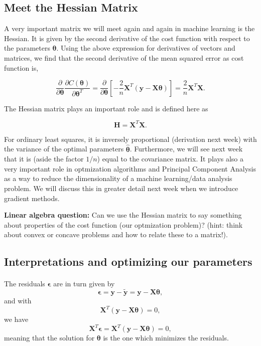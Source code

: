 \documentclass[%
oneside,                 %
final,                   %
10pt]{article}
\begin{document}
\subsection{Meet the Hessian Matrix}

A very important matrix we will meet again and again in machine
learning is the Hessian.  It is given by the second derivative of the
cost function with respect to the parameters $\bm{\theta}$. Using the above
expression for derivatives of vectors and matrices, we find that the
second derivative of the mean squared error as cost function is,

\[
\frac{\partial}{\partial \bm{\theta}}\frac{\partial C(\bm{\theta})}{\partial \bm{\theta}^T} =\frac{\partial}{\partial \bm{\theta}}\left[-\frac{2}{n}\bm{X}^T\left( \bm{y}-\bm{X}\bm{\theta}\right)\right]=\frac{2}{n}\bm{X}^T\bm{X}.  
\]

The Hessian matrix plays an important role and is defined here as

\[
\bm{H}=\bm{X}^T\bm{X}.
\]

For ordinary least squares, it is inversely proportional (derivation
next week) with the variance of the optimal parameters
$\hat{\bm{\theta}}$. Furthermore, we will see next week that it is
(aside the factor $1/n$) equal to the covariance matrix. It plays also a very
important role in optmization algorithms and Principal Component
Analysis as a way to reduce the dimensionality of a machine learning/data analysis
problem. We will discuss this in greater detail next week when we introduce gradient methods.

\textbf{Linear algebra question:}  Can we use the Hessian matrix to say something about properties of the cost function (our optmization  problem)? (hint: think about convex or concave problems and how to relate these to a matrix!). 

\subsection{Interpretations and optimizing our parameters}


\paragraph{}
The residuals $\bm{\epsilon}$ are in turn given by
\[
\bm{\epsilon} = \bm{y}-\bm{\tilde{y}} = \bm{y}-\bm{X}\bm{\theta},
\]
and with 
\[
\bm{X}^T\left( \bm{y}-\bm{X}\bm{\theta}\right)= 0, 
\]
we have
\[
\bm{X}^T\bm{\epsilon}=\bm{X}^T\left( \bm{y}-\bm{X}\bm{\theta}\right)= 0, 
\]
meaning that the solution for $\bm{\theta}$ is the one which minimizes the residuals.
\end{document}

